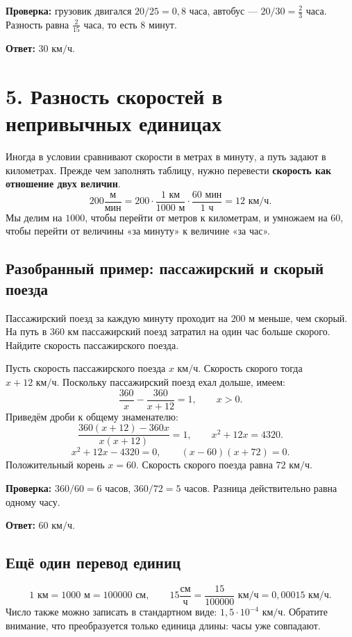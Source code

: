 \documentclass[a4paper,12pt]{article}
\newcommand{\topic}[1]{\section*{\color{darkaccent}#1}}
\newcommand{\subtopic}[1]{\subsection*{\color{accent}#1}}
\newcommand{\key}[1]{\textbf{\color{darkaccent}#1}}
\newcommand{\kmh}{\text{ км/ч}}
\newcommand{\kms}{\text{ км}}
\newcommand{\met}{\text{ м}}
\begin{document}
\key{Проверка:} грузовик двигался $20/25=0{,}8$ часа, автобус --- $20/30=\frac23$ часа. Разность равна $\frac{2}{15}$ часа, то есть $8$ минут.

\key{Ответ:} $30\kmh$.

\topic{5. Разность скоростей в непривычных единицах}
Иногда в условии сравнивают скорости в метрах в минуту, а путь задают в километрах. Прежде чем заполнять таблицу, нужно перевести \key{скорость как отношение двух величин}.
\[
200\frac{\text{м}}{\text{мин}}
=200\cdot\frac{1\text{ км}}{1000\text{ м}}\cdot\frac{60\text{ мин}}{1\text{ ч}}
=12\kmh.
\]
Мы делим на $1000$, чтобы перейти от метров к километрам, и умножаем на $60$, чтобы перейти от величины «за минуту» к величине «за час».

\subtopic{Разобранный пример: пассажирский и скорый поезда}
Пассажирский поезд за каждую минуту проходит на $200\met$ меньше, чем скорый. На путь в $360\kms$ пассажирский поезд затратил на один час больше скорого. Найдите скорость пассажирского поезда.

Пусть скорость пассажирского поезда $x\kmh$. Скорость скорого тогда $x+12\kmh$. Поскольку пассажирский поезд ехал дольше, имеем:
\[
\frac{360}{x}-\frac{360}{x+12}=1,\qquad x>0.
\]
Приведём дроби к общему знаменателю:
\[
\frac{360(x+12)-360x}{x(x+12)}=1,\qquad
x^2+12x=4320.
\]
\[
x^2+12x-4320=0,\qquad (x-60)(x+72)=0.
\]
Положительный корень $x=60$. Скорость скорого поезда равна $72\kmh$.

\key{Проверка:} $360/60=6$ часов, $360/72=5$ часов. Разница действительно равна одному часу.

\key{Ответ:} $60\kmh$.

\subtopic{Ещё один перевод единиц}
\[
1\kms=1000\met=100000\text{ см},\qquad
15\frac{\text{см}}{\text{ч}}=\frac{15}{100000}\kmh=0{,}00015\kmh.
\]
Число также можно записать в стандартном виде: $1{,}5\cdot10^{-4}\kmh$. Обратите внимание, что преобразуется только единица длины: часы уже совпадают.
\end{document}
